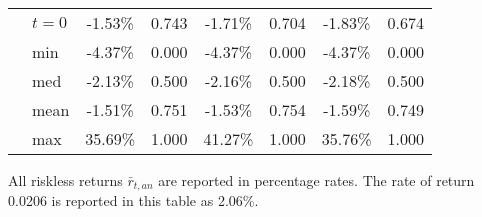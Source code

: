 \documentclass[letterpaper,12pt]{article}
\theoremstyle{definition}
\begin{document}
\begin{spacing}{1.5}
\begin{table}[htbp]
\begin{threeparttable}
\begin{tabular}{>{\small}c >{\small}l| >{\small}c >{\small}c| >{\small}c >{\small}c| >{\small}c >{\small}c}
      & $t=0$ & -1.53\% & 0.743 & -1.71\% & 0.704 & -1.83\% & 0.674 \\
      & min & -4.37\% & 0.000 & -4.37\% & 0.000 & -4.37\% & 0.000 \\
      & med & -2.13\% & 0.500 & -2.16\% & 0.500 & -2.18\% & 0.500 \\
      & mean & -1.51\% & 0.751 & -1.53\% & 0.754 & -1.59\% & 0.749 \\
      & max & 35.69\% & 1.000 & 41.27\% & 1.000 & 35.76\% & 1.000 \\
      \hline\hline
    \end{tabular}
    \begin{tablenotes}
      \scriptsize{\item[]All riskless returns $\bar{r}_{t,an}$ are reported in percentage rates. The rate of return 0.0206 is reported in this table as 2.06\%.}
    \end{tablenotes}
    \end{threeparttable}
  \end{table}


\end{spacing}
\end{document}
